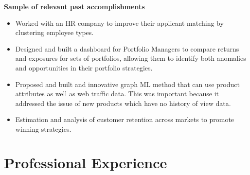 \documentclass[10pt, letterpaper]{article} %
\begin{document}
 {\textbf {Sample of relevant past accomplishments}}  
 \vspace{-3pt}
\begin{itemize}
\item Worked with an HR company to improve their applicant matching by clustering employee types.
\item Designed and built a dashboard for Portfolio Managers to compare returns and exposures for sets of portfolios, allowing them to identify both anomalies and opportunities in their portfolio strategies. 
 \item  Proposed and built and innovative graph ML
  method that can use product attributes as well as web traffic data.  This was important because
  it addressed the issue of new products which have no 
    history of view data.

\item Estimation and analysis of customer retention across markets to promote winning strategies. 
\end{itemize}




\vspace{3pt}



\hypertarget{professional-experience}{\section{\texorpdfstring{
{ \textbf{ {Professional Experience}}}}{Professional Experience}}\label{professional-experience}}

\end{document}
